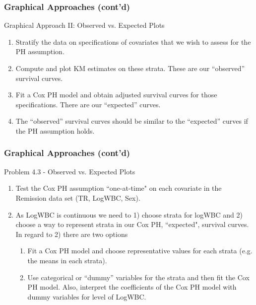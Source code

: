 \documentclass{beamer}
\theoremstyle{definition}
\begin{document}
\begin{frame}
\frametitle{Graphical Approaches (cont'd)}
\begin{block}{Graphical Approach II: Observed vs. Expected Plots}
\begin{enumerate}
\item Stratify the data on specifications of covariates that we wish to assess for the PH assumption.
\item Compute and plot KM estimates on these strata. These are our ``observed'' survival curves.
\item Fit a Cox PH model and obtain adjusted survival curves for those specifications. There are our ``expected'' curves.
\item The ``observed'' survival curves should be similar to the ``expected'' curves if the PH assumption holds.
\end{enumerate}
\end{block}
\end{frame}

\begin{frame}
\frametitle{Graphical Approaches (cont'd)}
\begin{block}{Problem 4.3 - Observed vs. Expected Plots}
\begin{enumerate}
\item Test the Cox PH assumption ``one-at-time" on each covariate in the Remission data set (TR, LogWBC, Sex).
\item As LogWBC is continuous we need to 1) choose strata for logWBC and 2) choose a way to represent strata in our Cox PH, ``expected", survival curves. In regard to 2) there are two options
\begin{enumerate}
\item Fit a Cox PH model and choose representative values for each strata (e.g. the means in each strata).
\item Use categorical or ``dummy'' variables for the strata and then fit the Cox PH model. Also, interpret the coefficients of the Cox PH model with dummy variables for level of LogWBC. 
\end{enumerate}
\end{enumerate}
\end{block}
\end{frame}
\end{document}
